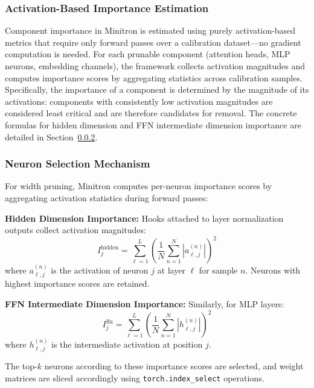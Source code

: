 \documentclass{article}
\begin{document}
\subsubsection{Activation-Based Importance Estimation}

Component importance in Minitron is estimated using purely activation-based metrics that require only forward passes over a calibration dataset---no gradient computation is needed. For each prunable component (attention heads, MLP neurons, embedding channels), the framework collects activation magnitudes and computes importance scores by aggregating statistics across calibration samples. Specifically, the importance of a component is determined by the magnitude of its activations: components with consistently low activation magnitudes are considered least critical and are therefore candidates for removal. The concrete formulas for hidden dimension and FFN intermediate dimension importance are detailed in Section~\ref{sec:neuron-selection}.

\subsubsection{Neuron Selection Mechanism}
\label{sec:neuron-selection}

For width pruning, Minitron computes per-neuron importance scores by aggregating activation statistics during forward passes:

\textbf{Hidden Dimension Importance:} Hooks attached to layer normalization outputs collect activation magnitudes:
\begin{equation}
    I_j^{\text{hidden}} = \sum_{\ell=1}^{L} \left( \frac{1}{N} \sum_{n=1}^{N} |a_{\ell,j}^{(n)}| \right)^2
\end{equation}
where $a_{\ell,j}^{(n)}$ is the activation of neuron $j$ at layer $\ell$ for sample $n$. Neurons with highest importance scores are retained.

\textbf{FFN Intermediate Dimension Importance:} Similarly, for MLP layers:
\begin{equation}
    I_j^{\text{ffn}} = \sum_{\ell=1}^{L} \left( \frac{1}{N} \sum_{n=1}^{N} |h_{\ell,j}^{(n)}| \right)^2
\end{equation}
where $h_{\ell,j}^{(n)}$ is the intermediate activation at position $j$.

The top-$k$ neurons according to these importance scores are selected, and weight matrices are sliced accordingly using \texttt{torch.index\_select} operations.
\end{document}
